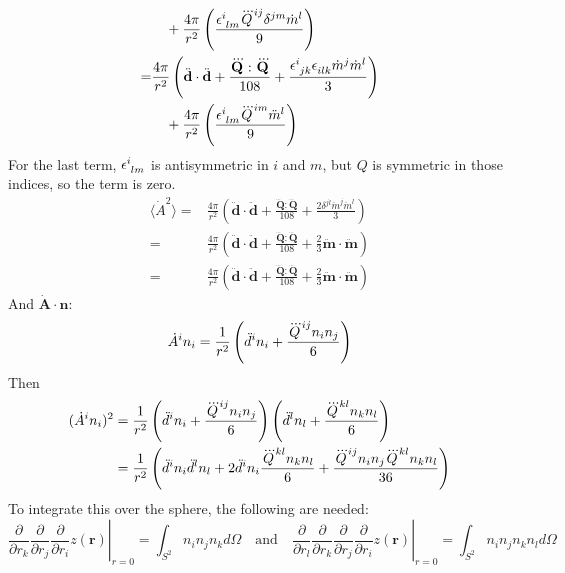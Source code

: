 \documentclass[12pt,a4]{article}
\begin{document}
\begin{enumerate}
\begin{enumerate}
\begin{align*}
            &\quad + \frac{4\pi}{r^2}\left(\frac{ \tensor{\epsilon}{^i_l_m}\dddot{Q}^{ij}\delta^{jm} \dot m^l}{9} \right)\\
          = &\frac{4\pi}{r^2}\left(\ddot{\mathbf{d}} \cdot \ddot{\mathbf{d}} + \frac{\dddot{\mathbf{Q}}:\dddot{\mathbf{Q}}}{108} + \frac{\tensor{\epsilon}{^i_j_k}\tensor{\epsilon}{_i_l_k}\dot m^j \dot m^l}{3}\right) \\
            &\quad + \frac{4\pi}{r^2}\left(\frac{ \tensor{\epsilon}{^i_l_m}\dddot{Q}^{im} \ddot m^l}{9} \right)\\
        \end{align*}
        For the last term, $\tensor{\epsilon}{^i_l_m}$ is antisymmetric in $i$ and $m$, but $Q$ is symmetric in those indices, so the term is zero.
        \begin{align*}
          \langle\dot A^2\rangle
          = &\frac{4\pi}{r^2}\left(\ddot{\mathbf{d}} \cdot \ddot{\mathbf{d}} + \frac{\dddot{\mathbf{Q}}:\dddot{\mathbf{Q}}}{108} + \frac{2 \delta^{jl}\ddot m^j \ddot m^l}{3}\right) \\
          = &\frac{4\pi}{r^2}\left(\ddot{\mathbf{d}} \cdot \ddot{\mathbf{d}} + \frac{\dddot{\mathbf{Q}}:\dddot{\mathbf{Q}}}{108} + \frac{2}{3}\ddot{\mathbf{ m}}\cdot \ddot{\mathbf{ m}}\right) \\
          = &\frac{4\pi}{r^2}\left(\ddot{\mathbf{d}} \cdot \ddot{\mathbf{d}} + \frac{\dddot{\mathbf{Q}}:\dddot{\mathbf{Q}}}{108} + \frac{2}{3}\ddot{\mathbf{ m}}\cdot \ddot{\mathbf{ m}}\right) 
        \end{align*}
        And $\dot{\mathbf{A}} \cdot \mathbf{n}$:
        \begin{align*}
          \dot{A}^in_i = \frac{1}{r^2}\left(\ddot{d}^in_i + \frac{\tensor{\dddot{Q}}{^i^j}n_in_j}{6}\right)
        \end{align*}
        Then
        \begin{align*}
          (\dot{A}^in_i)^2 &= \frac{1}{r^2}\left(\ddot{d}^in_i + \frac{\tensor{\dddot{Q}}{^i^j}n_in_j}{6}\right)\left(\ddot{d}^ln_l + \frac{\tensor{\dddot{Q}}{^k^l}n_kn_l}{6}\right)\\
                           &= \frac{1}{r^2}\left(\ddot{d}^in_i \ddot{d}^ln_l + 2\ddot{d}^in_i\frac{\tensor{\dddot{Q}}{^k^l}n_kn_l}{6} + \frac{\tensor{\dddot{Q}}{^i^j}n_in_j\tensor{\dddot{Q}}{^k^l}n_kn_l}{36}\right)
        \end{align*}
        To integrate this over the sphere, the following are needed:
        \begin{equation*}
          \left.\frac{\partial}{\partial r_k}\frac{\partial}{\partial r_j}\frac{\partial}{\partial r_i}z(\mathbf{r})\right|_{r = 0} = \int_{S^2} n_i n_j n_k d \Omega\quad \text{and} \quad \left.\frac{\partial}{\partial r_l}\frac{\partial}{\partial r_k}\frac{\partial}{\partial r_j}\frac{\partial}{\partial r_i}z(\mathbf{r})\right|_{r = 0} = \int_{S^2} n_i n_j n_k n_l d \Omega

\end{equation*}
\end{enumerate}
\end{enumerate}
\end{document}
